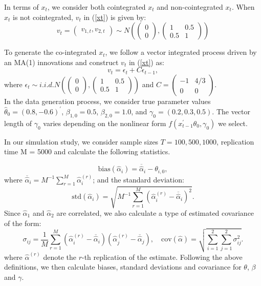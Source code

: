 \documentclass[a4paper,12pt,times,numbered,print,index]{report}
\numberwithin{equation}{section}
\begin{document}
	In terms of $x_t$, we consider both cointegrated $x_t$ and non-cointegrated $x_t$. When $x_t$ is not cointegrated, $v_t$ in (\ref{xt}) is given by:
	$$
	v_{t} =\left(\begin{array}{c}
	v_{1, t}, 
	v_{2, t}
	\end{array}\right) \sim N\left(\left(\begin{array}{c}
	0 \\
	0
	\end{array}\right),\left(\begin{array}{cc}
	1 & 0.5 \nonumber \\
	0.5 & 1
	\end{array}\right)\right)
	$$
	
	To generate the co-integrated $x_t$, we follow a vector integrated process driven by an MA(1) innovations and construct $v_t$ in (\ref{xt}) as:
	$$v_t = \epsilon_t + C\epsilon_{t-1},$$
	where $\epsilon_{t} \sim i.i.d. N\left(\left(\begin{array}{c}
	0 \\
	0
	\end{array}\right)
	,\left(\begin{array}{cc}1 & 0.5 \\ 0.5 & 1\end{array}\right)\right)$ and $C=\left(\begin{array}{cc} -1  & 4/ 3 \\ 0 & 0\end{array}\right)$. 
	\\
	
	In the data generation process, we consider true parameter values $\hat{\theta}_0 = (0.8, -0.6)^{\prime}$, $\beta_{1,0} = 0.5$, $\beta_{2,0} = 1.0$, and $\gamma_0 = (0.2, 0.3, 0.5)$. The vector length of $\gamma_{0}$ varies depending on the nonlinear form $f\left(x_{t-1}^{\prime }\theta _{0},\gamma _{0}\right)$ we select. 
	
	In our simulation study, we consider sample sizes $T = 100, 500,  1000$, replication time M = 5000 and calculate the following statistics.
	
	\[
	\text{bias}({\hat\alpha_i})=\overline{\widehat{\alpha}}_{i}-\theta _{i,0}, 
	\]%
	where $\overline{\widehat{\alpha}}_{i}=M^{-1}\sum_{r=1}^{M}\widehat{\alpha}_{i}^{(r)} $; and the standard deviation: 
	\[
	\text{std}({\hat\alpha_i}) =\sqrt{M^{-1}\sum_{r=1}^{M}\left( \widehat{\alpha}_{i}^{(r)}-\overline{\widehat{\alpha}}_{i}\right) ^{2}}. 
	\]%
	Since $\widehat{\alpha}_1$ and $\widehat{\alpha}_{2}$ are correlated, we also calculate a type of estimated covariance of the form:
	\begin{equation*}
		\label{std of theta}
		\sigma_{ij}=\frac{1}{M} \sum_{r=1}^{M}\left(\widehat{\alpha}_{i}^{(r)}-\overline{\widehat{\alpha}}_{i}\right)\left(\widehat{\alpha}_{j}^{(r)}-\overline{\widehat{\alpha}}_{j}\right), \quad \text {cov}(\hat{\alpha}) = \sqrt{\sum_{i=1}^{2}\sum_{j=1}^{2}\sigma_{ij}^{2}}.
	\end{equation*}
	where 
	$\widehat{\alpha}^{(r)}$ denote the $r$-th replication of the estimate.
	Following the above definitions, we then calculate biases, standard deviations and covariance for $\theta$, $\beta$ and $\gamma$.
	
\end{document}
